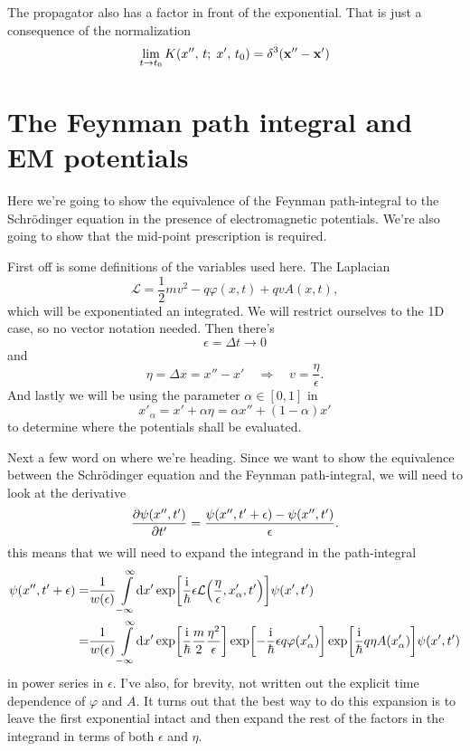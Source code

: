 \documentclass[11pt,letter, swedish, english
]{article}
\begin{document}
The propagator also has a factor in front of the exponential. That is
just a consequence of the normalization
\begin{equation}
\lim_{t\to t_0} K(x'',\, t;\; x',\, t_0)
=\delta^3\qty(\vb{x}''-\vb{x}')
\end{equation}


\section{The Feynman path integral and EM potentials}
Here we're going to show the equivalence of the Feynman path-integral
to the Schrödinger equation in the presence of electromagnetic
potentials. We're also going to show that the mid-point prescription is
required. 

First off is some definitions of the variables used here.
The Laplacian
\begin{equation}
\mathcal{L}=\frac{1}{2}m v^2 - q\varphi(x, t) + qvA(x, t),
\end{equation}
which will be exponentiated an integrated. We will restrict ourselves
to the 1D case, so no vector notation needed. Then there's
\begin{equation}
\epsilon=\Delta{t}\to0
\end{equation}
and
\begin{equation}
\eta=\Delta{x}=x''-x'
\quad\Longrightarrow\quad
v=\frac{\eta}{\epsilon}.
\end{equation}
And lastly we will be using the parameter $\alpha\in[0, 1]$ in
\begin{equation}
x'_\alpha=x'+\alpha\eta=\alpha x'' + (1-\alpha)x'
\end{equation}
to determine where the potentials shall be evaluated.

Next a few word on where we're heading. Since we want to show the
equivalence between the Schrödinger equation and the Feynman
path-integral, we will need to look at the derivative
\begin{equation}
\pdv{\psi(x'', t')}{t'} = \frac{\psi(x'', t'+\epsilon)-\psi(x'', t')}{\epsilon}.
\end{equation}
this means that we will need to expand the integrand in the path-integral
\begin{equation}
\begin{aligned}
\psi(x'', t'+\epsilon)=&\frac{1}{w(\epsilon)}\int_{-\infty}^{\infty}\!\rd{x'}
\exp[\frac{\ii}{\hbar}\epsilon
\mathcal{L}\qty(\frac{\eta}{\epsilon}, x'_\alpha, t')]\psi(x', t')\\
=&\frac{1}{w(\epsilon)}\int_{-\infty}^{\infty}\!\rd{x'}
\exp[\frac{\ii}{\hbar}\frac{m}{2}\frac{\eta^2}{\epsilon}]
\exp[-\frac{\ii}{\hbar}\epsilon q\varphi(x'_\alpha)]
\exp[\frac{\ii}{\hbar} q\eta A(x'_\alpha)]
\psi(x', t')
\end{aligned}
\end{equation}
in power series in $\epsilon$. I've also, for brevity, not written out
the explicit time dependence of $\varphi$ and $A$. It turns out that
the best way to do this expansion is to leave the first exponential
intact and then expand the rest of the factors in the integrand in
terms of both $\epsilon$ and $\eta$.
\end{document}
